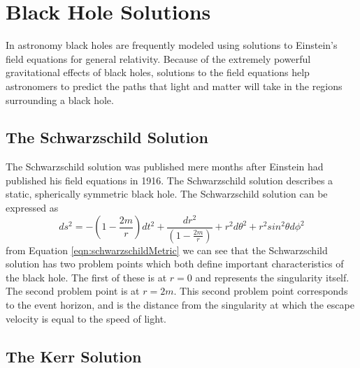\documentclass[12pt, oneside]{smuthesis}
\begin{document}
\section{\sc Black Hole Solutions} \label{blackHoleSolutions}

In astronomy black holes are frequently modeled using solutions to Einstein's field equations for general relativity. Because of the extremely powerful gravitational effects of black holes, solutions to the field equations help astronomers to predict the paths that light and matter will take in the regions surrounding a black hole.

\subsection{\sc The Schwarzschild Solution} \label{schwarzschildSolution}

The Schwarzschild solution was published mere months after Einstein had published his field equations in 1916. The Schwarzschild solution describes a static, spherically symmetric black hole. The Schwarzschild solution can be expressed as
\begin{equation}\label{eqn:schwarzschildMetric}
ds^{2}=-\left(1-\frac{2m}{r}\right)dt^{2}+\frac{dr^{2}}{\left(1-\frac{2m}{r}\right)}+r^{2}d\theta^{2}+r^{2}sin^{2}\theta d\phi^{2}
\end{equation}
from Equation \ref{eqn:schwarzschildMetric} we can see that the Schwarzschild solution has two problem points which both define important characteristics of the black hole. The first of these is at $r=0$ and represents the singularity itself. The second problem point is at $r=2m$. This second problem point corresponds to the event horizon, and is the distance from the singularity at which the escape velocity is equal to the speed of light.

\subsection{\sc The Kerr Solution} \label{kerrSolution}
\end{document}
